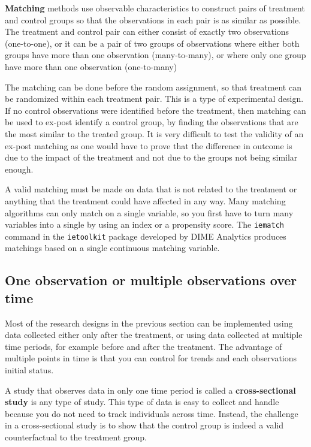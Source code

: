 
\textbf{Matching}
methods use observable characteristics to construct pairs of treatment and control groups
so that the observations in each pair is as similar as possible. 
The treatment and control pair can either consist of exactly two observations (one-to-one),
or it can be a pair of two groups of observations where either both groups have more than one observation (many-to-many),
or where only one group have more than one observation (one-to-many)
  
The matching can be done before the random assignment, 
so that treatment can be randomized within each treatment pair. 
This is a type of experimental design. 
If no control observations were identified before the treatment, 
then matching can be used to ex-post identify a control group, 
by finding the observations that are the most similar to the treated group.
It is very difficult to test the validity of an ex-post matching 
as one would have to prove that the difference in outcome is 
due to the impact of the treatment and not due to the groups not being similar enough.

A valid matching must be made on data that is not related to the treatment 
or anything that the treatment could have affected in any way. 
Many matching algorithms can only match on a single variable, 
so you first have to turn many variables into a single by using an index or a propensity score.
The \texttt{iematch} command in the \texttt{ietoolkit} package developed by DIME Analytics 
produces matchings based on a single continuous matching variable.




\subsection{One observation or multiple observations over time}

Most of the research designs in the previous section can be implemented 
using data collected either only after the treatment, 
or using data collected at multiple time periods, 
for example before and after the treatment. 
The advantage of multiple points in time is 
that you can control for trends and each observations initial status.

A study that observes data in only one time period is called 
a \textbf{cross-sectional study} is any type of study. 
This type of data is easy to collect and handle because
you do not need to track individuals across time. 
Instead, the challenge in a cross-sectional study is to
show that the control group is indeed a valid counterfactual to the treatment group.

